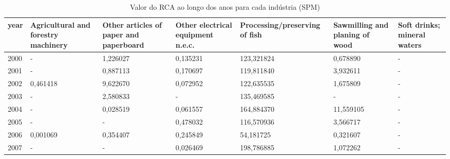 \begin{table}
\centering
\caption{Valor do RCA ao longo dos anos para cada indústria (SPM)}
\begin{tabular}{p{1cm}p{2cm}p{2cm}p{2cm}p{2cm}p{2cm}p{2cm}}
\toprule
 year &  Agricultural and forestry machinery &  Other articles of paper and paperboard &  Other electrical equipment n.e.c. &  Processing/preserving of fish &  Sawmilling and planing of wood &  Soft drinks; mineral waters \\
\midrule
 2000 &                                    - &                                1,226027 &                           0,135231 &                     123,321824 &                        0,678890 &                            - \\
 2001 &                                    - &                                0,887113 &                           0,170697 &                     119,811840 &                        3,932611 &                            - \\
 2002 &                             0,461418 &                                9,622670 &                           0,072952 &                     122,635535 &                        1,675809 &                            - \\
 2003 &                                    - &                                2,580833 &                                  - &                     135,469585 &                               - &                            - \\
 2004 &                                    - &                                0,028519 &                           0,061557 &                     164,884370 &                       11,559105 &                            - \\
 2005 &                                    - &                                       - &                           0,478032 &                     116,570936 &                        3,566717 &                            - \\
 2006 &                             0,001069 &                                0,354407 &                           0,245849 &                      54,181725 &                        0,321607 &                            - \\
 2007 &                                    - &                                       - &                           0,026469 &                     198,786885 &                        1,072262 &                            - \\

\end{tabular}
\end{table}
